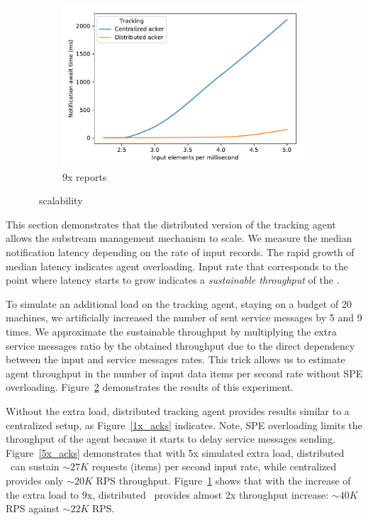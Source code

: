 \begin{figure}[t!]
\begin{subfigure}[b]{0.30\textwidth}
            \includegraphics[width=0.99\textwidth]{pics/scalability_09x.pdf}
            \caption{9x reports}
            \label{9x_acks}
    \end{subfigure}
    \caption{\tracker\ scalability}
    \label{notification_scalability}
\end{figure}
This section demonstrates that the distributed version of the tracking agent allows the substream management mechanism to scale. We measure the median notification latency depending on the rate of input records. The rapid growth of median latency indicates agent overloading. Input rate that corresponds to the point where latency starts to grow indicates a {\em sustainable throughput} of the \tracker. 

To simulate an additional load on the tracking agent, staying on a budget of 20 machines, we artificially increased the number of sent service messages by 5 and 9 times. We approximate the sustainable throughput by multiplying the extra service messages ratio by the obtained throughput due to the direct dependency between the input and service messages rates. This trick allows us to estimate agent throughput in the number of input data items per second rate without  SPE overloading. Figure~\ref{notification_scalability} demonstrates the results of this experiment.

Without the extra load, distributed tracking agent provides results similar to a centralized setup, as Figure~\ref{1x_acks} indicates. Note, SPE overloading limits the throughput of the agent because it starts to delay service messages sending. Figure~\ref{5x_acks} demonstrates that with 5x simulated extra load, distributed \tracker\ can sustain $\sim 27K$ requests (items) per second input rate, while centralized provides only $\sim 20K$ RPS throughput. Figure~\ref{9x_acks} shows that with the increase of the extra load to 9x, distributed \tracker\ provides almost 2x throughput increase: $\sim 40K$ RPS against $\sim 22K$ RPS. 

